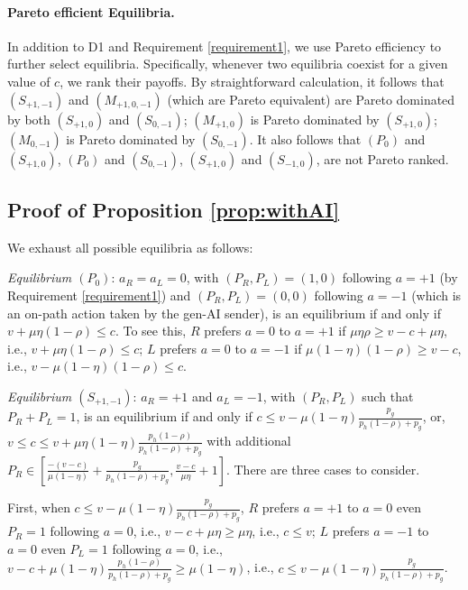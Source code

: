 \documentclass[english,12pt]{article}
\theoremstyle{plain}
\theoremstyle{plain}
\theoremstyle{definition}
\theoremstyle{definition}
\theoremstyle{assumption}
\theoremstyle{plain}
\theoremstyle{plain}
\theoremstyle{plain}
\theoremstyle{plain}
\theoremstyle{definition}%
\theoremstyle{plain}
\theoremstyle{plain}
\theoremstyle{plain}
\theoremstyle{plain}
\theoremstyle{plain}
\theoremstyle{plain}
\begin{document}
\paragraph{Pareto efficient Equilibria.} In addition to D1 and Requirement \ref{requirement1}, we use Pareto efficiency to further select equilibria. Specifically, whenever two equilibria coexist for a given value of $c$, we rank their payoffs. By straightforward calculation, it follows that $(S_{+1,-1})$ and $(M_{+1,0,-1})$ (which are Pareto equivalent) are Pareto dominated by both $(S_{+1,0})$ and $(S_{0,-1})$; $(M_{+1,0})$ is Pareto dominated by $(S_{+1,0})$; $(M_{0,-1})$ is Pareto dominated by $(S_{0,-1})$. It also follows that $(P_0)$ and $(S_{+1,0})$, $(P_0)$ and $(S_{0,-1})$, $(S_{+1,0})$ and $(S_{-1,0})$, are not Pareto ranked.





\subsection{Proof of Proposition \ref{prop:withAI}}

We exhaust all possible equilibria as follows:

\textit{Equilibrium $(P_0)$}: $a_R=a_L=0$, with $(P_R,P_L)=(1,0)$ following $a=+1$ (by Requirement \ref{requirement1}) and $(P_R,P_L)=(0,0)$ following $a=-1$ (which is an on-path action taken by the gen-AI sender), is an equilibrium if and only if $v+\mu\eta(1-\rho)\leq c$. To see this, $R$ prefers $a=0$ to $a=+1$ if $\mu\eta\rho\geq v-c+\mu\eta$, i.e., $v+\mu\eta(1-\rho)\leq c$; $L$ prefers $a=0$ to $a=-1$ if $\mu(1-\eta)(1-\rho)\geq v-c$, i.e., $v - \mu(1-\eta)(1-\rho)\leq c$.

\textit{Equilibrium $(S_{+1,-1})$}: $a_R=+1$ and $a_L=-1$, with $(P_R,P_L)$ such that $P_R+P_L=1$, is an equilibrium if and only if $c\leq v-\mu(1-\eta)\frac{p_g}{p_h(1-\rho)+p_g}$, or, $v\leq c\leq v+\mu\eta(1-\eta)\frac{p_h(1-\rho)}{p_h(1-\rho)+p_g}$ with additional $P_R\in[\frac{-(v-c)}{\mu(1-\eta)}+\frac{p_g}{p_h(1-\rho)+p_g}, \frac{v-c}{\mu\eta}+1]$. There are three cases to consider. 

First, when $c\leq v-\mu(1-\eta)\frac{p_g}{p_h(1-\rho)+p_g}$, $R$ prefers $a=+1$ to $a=0$ even $P_R=1$ following $a=0$, i.e., $v-c+\mu\eta\geq \mu\eta$, i.e., $c\leq v$; $L$ prefers $a=-1$ to $a=0$ even $P_L=1$ following $a=0$, i.e., $v-c+\mu(1-\eta)\frac{p_h(1-\rho)}{p_h(1-\rho)+p_g}\geq \mu(1-\eta)$, i.e., $c\leq v-\mu(1-\eta)\frac{p_g}{p_h(1-\rho)+p_g}$. 
\end{document}
